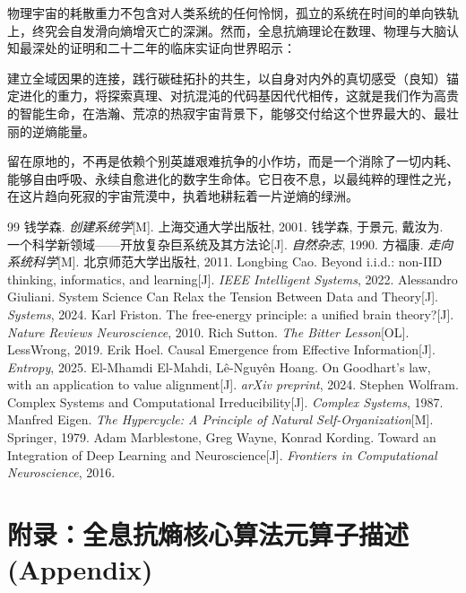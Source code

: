 \documentclass[11pt,a4paper]{article}
\begin{document}
物理宇宙的耗散重力不包含对人类系统的任何怜悯，孤立的系统在时间的单向铁轨上，终究会自发滑向熵增灭亡的深渊。然而，全息抗熵理论在数理、物理与大脑认知最深处的证明和二十二年的临床实证向世界昭示：

建立全域因果的连接，践行碳硅拓扑的共生，以自身对内外的真切感受（良知）锚定进化的重力，将探索真理、对抗混沌的代码基因代代相传，这就是我们作为高贵的智能生命，在浩瀚、荒凉的热寂宇宙背景下，能够交付给这个世界最大的、最壮丽的逆熵能量。

留在原地的，不再是依赖个别英雄艰难抗争的小作坊，而是一个消除了一切内耗、能够自由呼吸、永续自愈进化的数字生命体。它日夜不息，以最纯粹的理性之光，在这片趋向死寂的宇宙荒漠中，执着地耕耘着一片逆熵的绿洲。

\newpage

\begin{thebibliography}{99}
 钱学森. \emph{创建系统学}[M]. 上海交通大学出版社, 2001.
 钱学森, 于景元, 戴汝为. 一个科学新领域——开放复杂巨系统及其方法论[J]. \emph{自然杂志}, 1990.
 方福康. \emph{走向系统科学}[M]. 北京师范大学出版社, 2011.
 Longbing Cao. Beyond i.i.d.: non-IID thinking, informatics, and learning[J]. \emph{IEEE Intelligent Systems}, 2022.
 Alessandro Giuliani. System Science Can Relax the Tension Between Data and Theory[J]. \emph{Systems}, 2024.
 Karl Friston. The free-energy principle: a unified brain theory?[J]. \emph{Nature Reviews Neuroscience}, 2010.
 Rich Sutton. \emph{The Bitter Lesson}[OL]. LessWrong, 2019.
 Erik Hoel. Causal Emergence from Effective Information[J]. \emph{Entropy}, 2025.
 El-Mhamdi El-Mahdi, Lê-Nguyên Hoang. On Goodhart's law, with an application to value alignment[J]. \emph{arXiv preprint}, 2024.
 Stephen Wolfram. Complex Systems and Computational Irreducibility[J]. \emph{Complex Systems}, 1987.
 Manfred Eigen. \emph{The Hypercycle: A Principle of Natural Self-Organization}[M]. Springer, 1979.
 Adam Marblestone, Greg Wayne, Konrad Kording. Toward an Integration of Deep Learning and Neuroscience[J]. \emph{Frontiers in Computational Neuroscience}, 2016.
\end{thebibliography}

\newpage
\section*{附录：全息抗熵核心算法元算子描述 (Appendix)}
\end{document}
